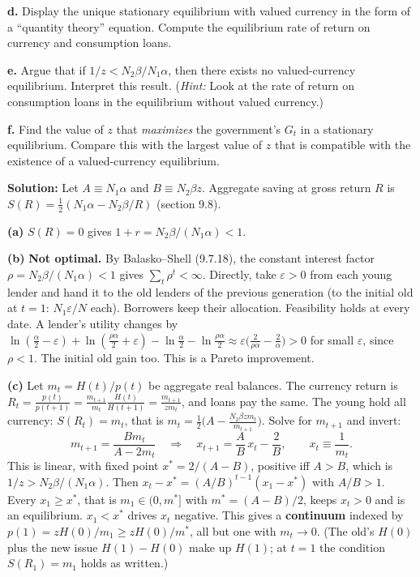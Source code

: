 \documentclass[12pt, letterpaper]{article}
\begin{document}
\begin{tcolorbox}[evenbox,title={Exercise 9.10 \quad Seignorage}]
\begin{tcolorbox}[questionbox]
\textbf{d.} Display the unique stationary equilibrium with valued currency in the form of a
``quantity theory'' equation. Compute the equilibrium rate of return on currency and consumption
loans.

\textbf{e.} Argue that if $1/z<N_2\beta/N_1\alpha$, then there exists no valued-currency equilibrium.
Interpret this result. (\emph{Hint:} Look at the rate of return on consumption loans in the
equilibrium without valued currency.)

\textbf{f.} Find the value of $z$ that \emph{maximizes} the government's $G_t$ in a stationary
equilibrium. Compare this with the largest value of $z$ that is compatible with the existence of a
valued-currency equilibrium.
\end{tcolorbox}

\textbf{Solution:} Let $A\equiv N_1\alpha$ and $B\equiv N_2\beta z$. Aggregate saving at gross return
$R$ is $S(R)=\frac12(N_1\alpha-N_2\beta/R)$ (section 9.8).

\textbf{(a)} $S(R)=0$ gives $\boxed{1+r=N_2\beta/(N_1\alpha)<1}$.

\textbf{(b)} \textbf{Not optimal.} By Balasko--Shell (9.7.18), the constant interest factor
$\rho=N_2\beta/(N_1\alpha)<1$ gives $\sum_t\rho^t<\infty$. Directly, take $\varepsilon>0$ from each
young lender and hand it to the old lenders of the previous generation (to the initial old at $t=1$:
$N_1\varepsilon/N$ each). Borrowers keep their allocation. Feasibility holds at every date. A lender's
utility changes by
$\ln(\frac\alpha2-\varepsilon)+\ln(\frac{\rho\alpha}2+\varepsilon)-\ln\frac\alpha2-\ln\frac{\rho\alpha}2
\approx\varepsilon\big(\frac2{\rho\alpha}-\frac2\alpha\big)>0$ for small $\varepsilon$, since $\rho<1$.
The initial old gain too. This is a Pareto improvement.

\textbf{(c)} Let $m_t=H(t)/p(t)$ be aggregate real balances. The currency return is
$R_t=\frac{p(t)}{p(t+1)}=\frac{m_{t+1}}{m_t}\frac{H(t)}{H(t+1)}=\frac{m_{t+1}}{zm_t}$, and loans pay the
same. The young hold all currency: $S(R_t)=m_t$, that is $m_t=\frac12\big(A-\frac{N_2\beta zm_t}{m_{t+1}}\big)$.
Solve for $m_{t+1}$ and invert:
\[
m_{t+1}=\frac{Bm_t}{A-2m_t}\quad\Longrightarrow\quad x_{t+1}=\frac AB\,x_t-\frac2B,\qquad x_t\equiv\frac1{m_t}.
\]
This is linear, with fixed point $x^*=2/(A-B)$, positive iff $A>B$, which is $1/z>N_2\beta/(N_1\alpha)$.
Then $x_t-x^*=(A/B)^{t-1}(x_1-x^*)$ with $A/B>1$. Every $x_1\ge x^*$, that is $m_1\in(0,m^*]$ with
$m^*=(A-B)/2$, keeps $x_t>0$ and is an equilibrium. $x_1<x^*$ drives $x_t$ negative. This gives a
\textbf{continuum} indexed by $p(1)=zH(0)/m_1\ge zH(0)/m^*$, all but one with $m_t\to0$. (The
old's $H(0)$ plus the new issue $H(1)-H(0)$ make up $H(1)$; at $t=1$ the condition $S(R_1)=m_1$ holds
as written.)


\end{tcolorbox}
\end{document}
